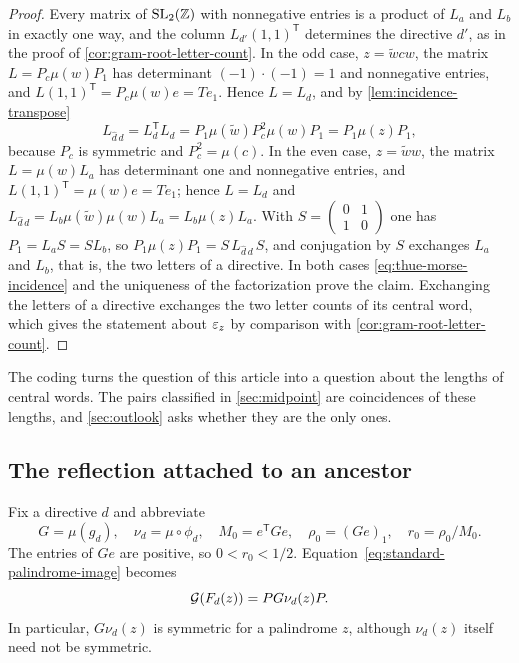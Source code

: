 \begin{proof}
Every matrix of $\operatorname{SL}_2(\mathbb{Z})$ with nonnegative entries is a product of $L_a$ and $L_b$ in
exactly one way, and the column $L_{d'}(1,1)^{\mathsf T}$ determines the directive $d'$, as in
the proof of \cref{cor:gram-root-letter-count}. In the odd case, $z=\widetilde wcw$, the
matrix $L=P_c\mu(w)P_1$ has determinant $(-1)\cdot(-1)=1$ and nonnegative entries, and
$L(1,1)^{\mathsf T}=P_c\mu(w)e=Te_1$. Hence $L=L_d$, and by \cref{lem:incidence-transpose}
$$
 L_{\widehat d\,d}=L_d^{\mathsf T}L_d=P_1\mu(\widetilde w)P_c^2\mu(w)P_1=P_1\mu(z)P_1,
$$
because $P_c$ is symmetric and $P_c^2=\mu(c)$. In the even case, $z=\widetilde ww$, the
matrix $L=\mu(w)L_a$ has determinant one and nonnegative entries, and
$L(1,1)^{\mathsf T}=\mu(w)e=Te_1$; hence $L=L_d$ and
$L_{\widehat d\,d}=L_b\mu(\widetilde w)\mu(w)L_a=L_b\mu(z)L_a$. With
$S=\left(\begin{smallmatrix}0&1\\1&0\end{smallmatrix}\right)$ one has $P_1=L_aS=SL_b$, so
$P_1\mu(z)P_1=S\,L_{\widehat d\,d}\,S$, and conjugation by $S$ exchanges $L_a$ and $L_b$, that
is, the two letters of a directive. In both cases \eqref{eq:thue-morse-incidence} and the
uniqueness of the factorization prove the claim. Exchanging the letters of a directive
exchanges the two letter counts of its central word, which gives the statement about
$\varepsilon_z$ by comparison with \cref{cor:gram-root-letter-count}.
\end{proof}

The coding turns the question of this article into a question about the lengths of central
words. The pairs classified in \cref{sec:midpoint} are coincidences of these lengths, and
\cref{sec:outlook} asks whether they are the only ones.

\subsection{The reflection attached to an ancestor}

Fix a directive $d$ and abbreviate
\begin{equation}\label{eq:ancestor-data}
 G=\mu(g_d),\quad \nu_d=\mu\circ\phi_d,\quad
 M_0=e^{\mathsf T}Ge,\quad \rho_0=(Ge)_1,\quad r_0=\rho_0/M_0.
\end{equation}
The entries of $Ge$ are positive, so $0<r_0<1/2$.
Equation~\eqref{eq:standard-palindrome-image} becomes
\begin{equation}\label{eq:image-gram}
 \mathcal{G}(F_d(z))=PG\nu_d(z)P.
\end{equation}
In particular, $G\nu_d(z)$ is symmetric for a palindrome $z$,
although $\nu_d(z)$ itself need not be symmetric.

